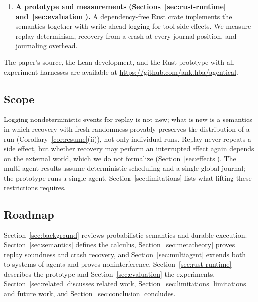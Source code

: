 \begin{enumerate}
\item \textbf{A prototype and measurements (Sections~\ref{sec:rust-runtime}
and~\ref{sec:evaluation}).}
A dependency-free Rust crate implements the semantics together with write-ahead logging for
tool side effects.
We measure replay determinism, recovery from a crash at every journal position, and journaling
overhead.

\end{enumerate}

\noindent
The paper's source, the Lean development, and the Rust prototype with all experiment
harnesses are available at \url{https://github.com/ankthba/agentical}.

\subsection*{Scope}

Logging nondeterministic events for replay is not new; what is new is a semantics in which
recovery with fresh randomness provably preserves the distribution of a run
(Corollary~\ref{cor:resume}(ii)), not only individual runs.
Replay never repeats a side effect, but whether recovery may perform an interrupted effect
again depends on the external world, which we do not formalize (Section~\ref{sec:effects}).
The multi-agent results assume deterministic scheduling and a single global journal; the
prototype runs a single agent. Section~\ref{sec:limitations} lists what lifting these
restrictions requires.

\subsection*{Roadmap}

Section~\ref{sec:background} reviews probabilistic semantics and durable execution.
Section~\ref{sec:semantics} defines the calculus, Section~\ref{sec:metatheory} proves replay
soundness and crash recovery, and Section~\ref{sec:multiagent} extends both to systems of
agents and proves noninterference.
Section~\ref{sec:rust-runtime} describes the prototype and Section~\ref{sec:evaluation} the
experiments.
Section~\ref{sec:related} discusses related work, Section~\ref{sec:limitations} limitations and
future work, and Section~\ref{sec:conclusion} concludes.
